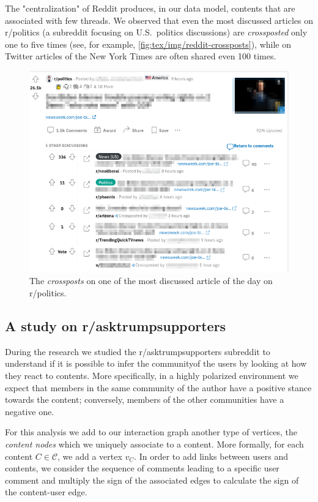 The "centralization" of Reddit produces, in our data model, contents that are
associated with few threads. We observed that even the most discussed articles
on r/politics (a subreddit focusing on U.S.\ politics discussions) are
\emph{crossposted} only one to five times (see, for example,
\autoref{fig:tex/img/reddit-crossposts}), while on Twitter articles of the New York Times are
often shared even 100 times.

\begin{figure}
	\centering
	\includegraphics[width=0.8\linewidth]{tex/img/reddit-crossposts.png}
	\caption{The \emph{crossposts} on one of the most discussed article of the
		day on r/politics.}%
	\label{fig:tex/img/reddit-crossposts}
\end{figure}

\subsection{A study on r/asktrumpsupporters}%
\label{sec:the_r_asktrumpsupporters_case}

During the research we studied the r/asktrumpsupporters subreddit to
understand if it is possible to infer the community\footnotemark of the users by
looking at how they react to contents. More specifically, in a highly polarized
environment we expect that members in the same community of the
author have a positive stance towards the content; conversely, members of the
other communities have a negative one.


\bigskip

For this analysis we add to our interaction graph another type of vertices, the
\emph{content nodes} which we uniquely associate to a content. More formally,
for each content $C \in \mathcal{C} $, we add a vertex $v_C$. In order to
add links between users and contents, we consider the sequence of comments
leading to a specific user comment and multiply the sign of the
associated edges to calculate the sign of the content-user edge.

